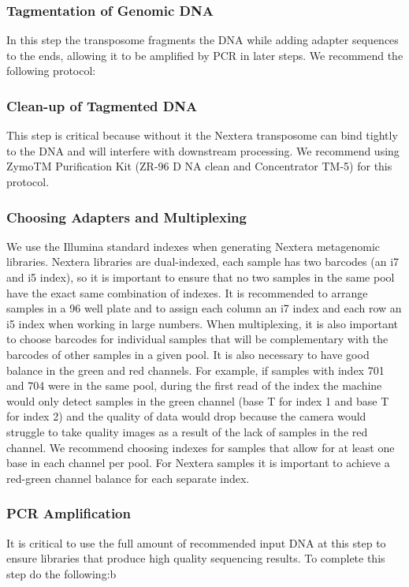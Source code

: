 \documentclass[graybox]{svmult}
\begin{document}
\subsubsection{Tagmentation of Genomic DNA}

In this step the transposome fragments the DNA while adding adapter sequences to the ends, allowing it to be amplified by PCR in later steps.
We recommend the following protocol:

\subsubsection{Clean-up of Tagmented DNA}

This step is critical because without it the Nextera transposome can bind tightly to the DNA and will interfere with downstream processing.  We recommend using ZymoTM Purification Kit (ZR-96 D NA clean and Concentrator TM-5) for this protocol. 


\subsubsection{Choosing Adapters and Multiplexing}

We use the Illumina standard indexes when generating Nextera metagenomic libraries. Nextera libraries are dual-indexed, each sample has two  barcodes (an i7 and i5 index), so it is important to ensure that no two samples in the same pool have the exact same combination of indexes. It is recommended to arrange samples in a 96 well plate and to assign each column an i7 index and each row an i5 index when working in large numbers. When multiplexing, it is also important to choose barcodes for individual samples that will be complementary with the barcodes of other samples in a given pool.  It is also necessary to have good balance in the green and red channels. For example, if samples with index 701 and 704 were in the same pool, during the first read of the index the machine would only detect samples in the green channel (base T for index 1 and base T for index 2) and the quality of data would drop because the camera would struggle to take quality images as a result of the lack of samples in the red channel. We recommend choosing indexes for samples that allow for at least one base in each channel per pool. For Nextera samples it is important to achieve a red-green channel balance for each separate index.


\subsubsection{PCR Amplification}
It is critical to use the full amount of recommended input DNA at this step to ensure libraries that produce high quality sequencing results. To complete this step do the following:b\\
\end{document}
